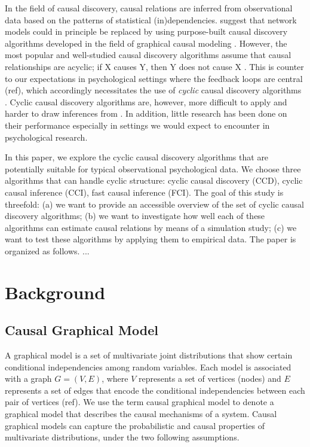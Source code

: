 \documentclass[11pt]{article}
\theoremstyle{definition}
\begin{document}
In the field of causal discovery, causal relations are inferred from observational data based on the patterns of statistical (in)dependencies. \cite{Ryan2022} suggest that network models could in principle be replaced by using purpose-built causal discovery algorithms developed in the field of graphical causal modeling \citep{spirtes_algorithm_1991}. However, the most popular and well-studied causal discovery algorithms assume that causal relationships are acyclic; if X causes Y, then Y does not cause X \citep{Glymour2019}. This is counter to our expectations in psychological settings where the feedback loops are central (ref), which accordingly necessitates the use of \textit{cyclic} causal discovery algorithms \citep{richardson1996}. Cyclic causal discovery algorithms are, however, more difficult to apply and harder to draw inferences from \citep{Bongers2021}. In addition, little research has been done on their performance especially in settings we would expect to encounter in psychological research.

In this paper, we explore the cyclic causal discovery algorithms that are potentially suitable for typical observational psychological data.
We choose three algorithms that can handle cyclic structure: cyclic causal discovery (CCD), cyclic causal inference (CCI), fast causal inference (FCI). The goal of this study is threefold: (a) we want to provide an accessible overview of the set of cyclic causal discovery algorithms; (b) we want to investigate how well each of these algorithms can estimate causal relations by means of a simulation study; (c) we want to test these algorithms by applying them to empirical data.
The paper is organized as follows. ...



\section{Background}

\subsection{Causal Graphical Model} 

A graphical model is a set of multivariate joint distributions that show certain conditional independencies among random variables. Each model is associated with a graph $G = (V, E)$, where $V$ represents a set of vertices (nodes) and $E$ represents a set of edges that encode the conditional independencies between each pair of vertices (ref). 
We use the term causal graphical model to denote a graphical model that describes the causal mechanisms of a system. 
Causal graphical models can capture the probabilistic and causal properties of multivariate distributions, under the two following assumptions.
\end{document}

